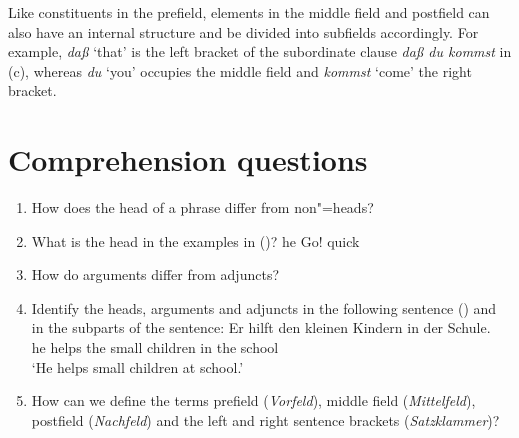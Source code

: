 \noindent
Like constituents in the prefield, elements in the middle field and postfield can also have an internal structure and be divided into subfields accordingly.
For example, \emph{daß} `that' is the left bracket of the subordinate clause \emph{daß du kommst} in (c), whereas \emph{du} `you' occupies the middle
field and \emph{kommst} `come' the right bracket.%









\section*{Comprehension questions}


\begin{enumerate}
\item How does the head of a phrase differ from non"=heads?
\item What is the head in the examples in ()?
      \eal
      \ex he
      \ex Go!
      \ex quick
      \zl
\item How do arguments differ from adjuncts?
\item Identify the heads, arguments and adjuncts in the following sentence () and in the subparts of the sentence:
  \ea
	\gll Er hilft den kleinen Kindern in der Schule.\\
		 he helps the small children in the school\\
	\glt `He helps small children at school.' 
  \z

\item How can we define the terms prefield (\emph{Vorfeld}), middle field (\emph{Mittelfeld}), postfield (\emph{Nachfeld}) and the left
and right sentence brackets (\emph{Satzklammer})?
\end{enumerate}


